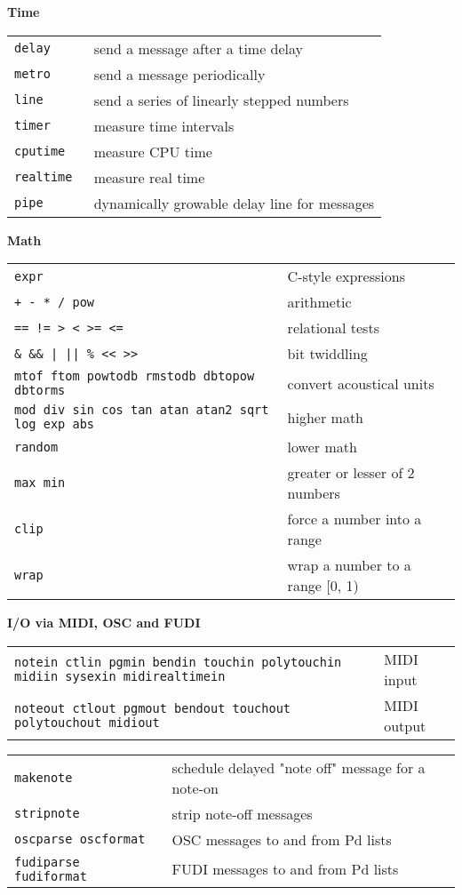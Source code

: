 \documentclass[a4paper, landscape, 10pt]{article}
\newcommand{\refcardtitle}[1]{
  \begin{center}
    \textbf{\small{#1}}
  \end{center}
}
\begin{document}
\begin{multicols}{3}
  \refcardtitle{Time}
  \begin{tabularx}{9cm}{>{\tt}l X}
    delay & send a message after a time delay \\
    metro & send a message periodically \\
    line & send a series of linearly stepped numbers \\
    timer & measure time intervals \\
    cputime & measure CPU time \\
    realtime & measure real time \\
    pipe & dynamically growable delay line for messages \\
  \end{tabularx}

  \refcardtitle{Math}
  \begin{tabularx}{9cm}{>{\tt}X X}
  	expr & C-style expressions \\
  	+ - * / pow  & arithmetic \\
    == != > < >= <= & relational tests \\
    \& \&\& | || \% << >> & bit twiddling \\
    mtof ftom powtodb rmstodb dbtopow dbtorms & convert acoustical units \\
    mod div sin cos tan atan atan2 sqrt log exp abs & higher math \\
    random & lower math \\ 
    max min & greater or lesser of 2 numbers \\
    clip & force a number into a range \\
    wrap & wrap a number to a range [0, 1)
  \end{tabularx}
  
  \columnbreak
  \refcardtitle{I/O via MIDI, OSC and FUDI}
  \begin{tabularx}{9cm}{>{\tt}X X}
    notein ctlin pgmin bendin touchin polytouchin midiin sysexin midirealtimein & MIDI input \\
    noteout ctlout pgmout bendout touchout polytouchout midiout & MIDI output \\
  \end{tabularx}
  \begin{tabularx}{9cm}{>{\tt}X X}
    makenote & schedule delayed "note off" message for a note-on \\
    stripnote & strip note-off messages \\
    oscparse oscformat & OSC messages to and from Pd lists \\
    fudiparse fudiformat & FUDI messages to and from Pd lists \\
  \end{tabularx}


\end{multicols}
\end{document}
